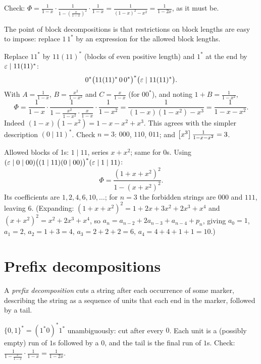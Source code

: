 Check: $\Phi = \frac{1}{1-x}\cdot\frac{1}{1 - \left(\frac{x}{1-x}\right)^2}\cdot\frac{1}{1-x}
= \frac{1}{(1-x)^2 - x^2} = \frac{1}{1-2x}$, as it must be.

The point of block decompositions is that restrictions on block lengths are easy to impose:
replace $1\,1^*$ by an expression for the allowed block lengths.

\begin{example}
Replace $11^*$ by $11(11)^*$ (blocks of even positive length) and $1^*$ at the end by
$\varepsilon \mid 11(11)^*$:
\[
0^*\big(11(11)^*\,0\,0^*\big)^*\big(\varepsilon\mid 11(11)^*\big).
\]
With $A = \frac{1}{1-x}$, $B = \frac{x^2}{1-x^2}$ and $C = \frac{x}{1-x}$ (for $00^*$), and noting
$1 + B = \frac{1}{1-x^2}$,
\[
\Phi = \frac{1}{1-x}\cdot\frac{1}{1 - \frac{x^2}{1-x^2}\cdot\frac{x}{1-x}}\cdot\frac{1}{1-x^2}
= \frac{1}{(1-x)(1-x^2) - x^3} = \frac{1}{1-x-x^2}.
\]
Indeed $(1-x)(1-x^2) = 1 - x - x^2 + x^3$. This agrees with the simpler description $(0\mid11)^*$.
Check $n = 3$: $000$, $110$, $011$; and $\left[x^{3}\right]\frac{1}{1-x-x^2} = 3$.
\end{example}

\begin{example}
Allowed blocks of 1s: $1 \mid 11$, series $x + x^2$; same for 0s. Using
$(\varepsilon\mid 0\mid00)\big((1\mid11)(0\mid00)\big)^*(\varepsilon\mid1\mid11)$:
\[
\Phi = \frac{(1+x+x^2)^2}{1-(x+x^2)^2}.
\]
Its coefficients are $1,2,4,6,10,\dots$; for $n=3$ the forbidden strings are $000$ and $111$,
leaving $6$. (Expanding: $(1 + x+x^2)^2 = 1 + 2x + 3x^2 + 2x^3 + x^4$ and $(x+x^2)^2 = x^2 + 2x^3
+ x^4$, so $a_n = a_{n-2} + 2a_{n-3} + a_{n-4} + p_n$, giving $a_0=1$, $a_1 = 2$, $a_2 = 1 + 3 = 4$,
$a_3 = 2 + 2 + 2 = 6$, $a_4 = 4 + 4 + 1 + 1 = 10$.)
\end{example}

\section{Prefix decompositions}

A \emph{prefix decomposition} cuts a string after each occurrence of some marker, describing
the string as a sequence of units that each end in the marker, followed by a tail.

\begin{example}
$\{0,1\}^* = (1^*0)^*1^*$ unambiguously: cut after every $0$. Each unit is a (possibly empty)
run of $1$s followed by a $0$, and the tail is the final run of $1$s. Check:
$\frac{1}{1 - \frac{x}{1-x}}\cdot\frac{1}{1-x} = \frac{1}{1-2x}$.
\end{example}

